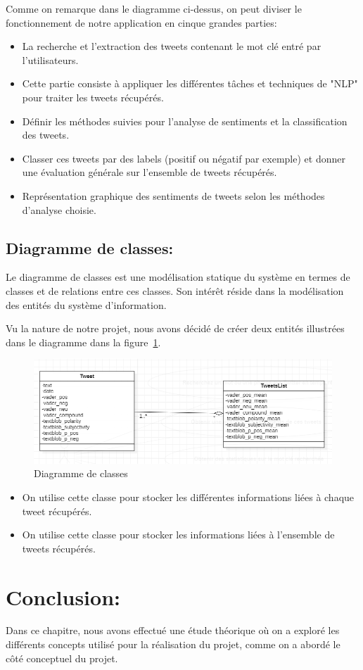 Comme on remarque dans le diagramme ci-dessus, on peut diviser le fonctionnement de notre application en cinque grandes parties:
\begin{itemize}
    \item {} La recherche et l'extraction des tweets contenant le mot clé entré par l'utilisateurs.
    \item {} Cette partie consiste à appliquer les différentes tâches et techniques de "NLP" pour traiter les tweets récupérés.
    \item {} Définir les méthodes suivies pour l'analyse de sentiments et la classification des tweets.
    \item {} Classer ces tweets par des labels (positif ou négatif par exemple) et donner une évaluation générale sur l'ensemble de tweets récupérés.
    \item {} Représentation graphique des sentiments de tweets selon les méthodes d'analyse choisie.
\end{itemize}

\subsection{Diagramme de classes:}
Le diagramme de classes est une modélisation statique du système en termes de classes et
de relations entre ces classes. Son intérêt réside dans la modélisation des entités du
système d'information.

Vu la nature de notre projet, nous avons décidé de créer deux entités illustrées dans le diagramme dans la figure~\ref{fig:classDiagram}.
\begin{figure}
    \centering
    \includegraphics[width=\textwidth]{etude-theorique-conception/assets/classDiagram.png}
    \caption{Diagramme de classes}
    \label{fig:classDiagram}
\end{figure}

\begin{itemize}
    \item {} On utilise cette classe pour stocker les différentes informations liées à chaque tweet récupérés.
    \item {} On utilise cette classe pour stocker les informations liées à l'ensemble de tweets récupérés.
\end{itemize}

\section{Conclusion:}
Dans ce chapitre, nous avons effectué une étude théorique où on a exploré les différents concepts utilisé pour la réalisation du projet, comme on a abordé le côté conceptuel du projet.



